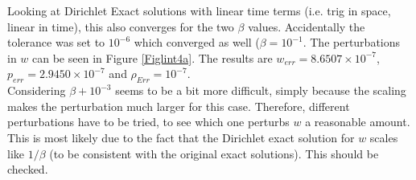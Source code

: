 \documentclass[11pt, a4paper]{article}
\theoremstyle{definition}
\begin{document}
Looking at Dirichlet Exact solutions with linear time terms (i.e. trig in space, linear in time), this also converges for the two $\beta$ values. Accidentally the tolerance was set to $10^{-6}$ which converged as well ($\beta = 10^{-1}$. The perturbations in $w$ can be seen in Figure \ref{Figlint4a}.
The results are $w_{err} = 8.6507 \times 10^{-7}$, $p_{err} = 2.9450 \times 10^{-7}$ and $\rho_{Err}= 10^{-7}$. \\
Considering $\beta+10^{-3}$ seems to be a bit more difficult, simply because the scaling makes the perturbation much larger for this case. Therefore, different perturbations have to be tried, to see which one perturbs $w$ a reasonable amount. This is most likely due to the fact that the Dirichlet exact solution for $w$ scales like $1/\beta$ (to be consistent with the original exact solutions). This should be checked.
\end{document}
